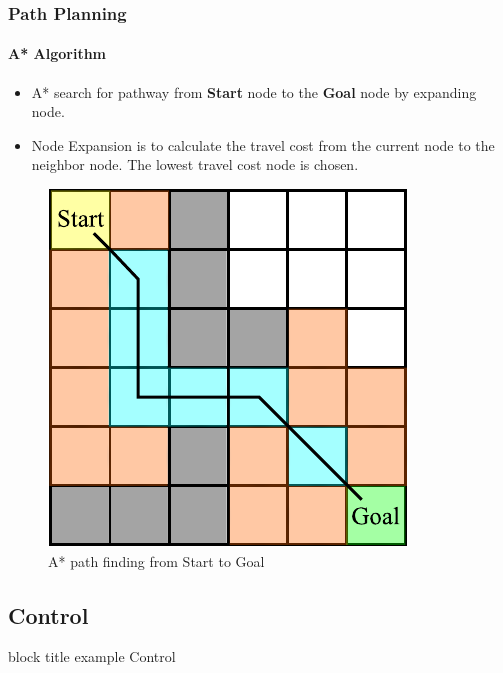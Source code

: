 \begin{frame}
	\frametitle{Path Planning}
	\framesubtitle{A* Algorithm}
	\begin{itemize}
		\item A* search for pathway from \textbf{Start} node to the \textbf{Goal} node by expanding node.
		\item Node Expansion is to calculate the travel cost from the current node to the neighbor node. The lowest travel cost node is chosen.
	\end{itemize}
	
	
	\begin{figure}
		\caption{A* path finding from Start to Goal}
		\includegraphics[scale=0.6]{image/astar_stog.pdf}
	\end{figure}
\end{frame}



\begin{frame}
	\subsection{Control}
	\begin{beamercolorbox}[rounded=true]{block title example}
		\centering
		\LARGE
		Control
	\end{beamercolorbox}
\end{frame}



